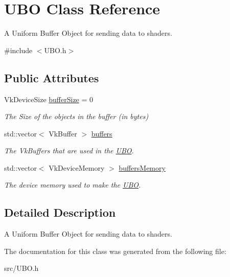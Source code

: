 \hypertarget{struct_u_b_o}{}\section{U\+BO Class Reference}
\label{struct_u_b_o}


A Uniform Buffer Object for sending data to shaders.  




{\ttfamily \#include $<$U\+B\+O.\+h$>$}

\subsection*{Public Attributes}
\begin{DoxyCompactItemize}
\item 
\mbox{\label{struct_u_b_o_aa60ecf6046a45b46bd74e00783a971d4}} 
Vk\+Device\+Size \mbox{\hyperlink{struct_u_b_o_aa60ecf6046a45b46bd74e00783a971d4}{buffer\+Size}} = 0
\begin{DoxyCompactList}\small\item\em The Size of the objects in the buffer (in bytes) \end{DoxyCompactList}\item 
\mbox{\label{struct_u_b_o_a2f85577121899349bac6b1dc660ec6f1}} 
std\+::vector$<$ Vk\+Buffer $>$ \mbox{\hyperlink{struct_u_b_o_a2f85577121899349bac6b1dc660ec6f1}{buffers}}
\begin{DoxyCompactList}\small\item\em The Vk\+Buffers that are used in the \mbox{\hyperlink{struct_u_b_o}{U\+BO}}. \end{DoxyCompactList}\item 
\mbox{\label{struct_u_b_o_ac42e09aebde600b3196237c3a44bbf2f}} 
std\+::vector$<$ Vk\+Device\+Memory $>$ \mbox{\hyperlink{struct_u_b_o_ac42e09aebde600b3196237c3a44bbf2f}{buffers\+Memory}}
\begin{DoxyCompactList}\small\item\em The device memory used to make the \mbox{\hyperlink{struct_u_b_o}{U\+BO}}. \end{DoxyCompactList}\end{DoxyCompactItemize}


\subsection{Detailed Description}
A Uniform Buffer Object for sending data to shaders. 

The documentation for this class was generated from the following file\+:\begin{DoxyCompactItemize}
\item 
src/U\+B\+O.\+h\end{DoxyCompactItemize}
